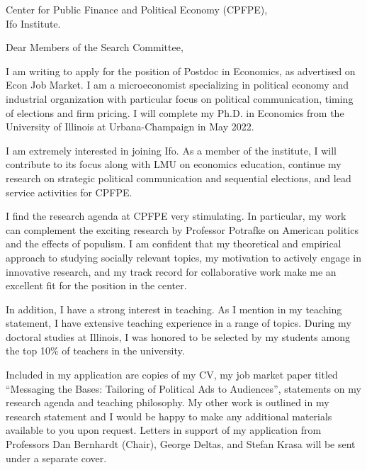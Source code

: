 \documentclass[12pt]{letter}
\begin{document}
\date{}
\begin{letter}{Center for Public Finance and Political Economy (CPFPE),\\
Ifo Institute.}

\opening{Dear Members of the Search Committee,}

I am writing to apply for the position of Postdoc in Economics, as advertised on Econ Job Market.
I am a microeconomist specializing in political economy and industrial organization with particular focus on political communication, timing of elections and firm pricing.
I will complete my Ph.D. in Economics from the University of Illinois at Urbana-Champaign in May 2022. 

I am extremely interested in joining Ifo.
As a member of the institute, I will contribute to its focus along with LMU on economics education,
continue my research on strategic political communication and sequential elections, and lead service activities for CPFPE.

I find the research agenda at CPFPE very stimulating.
In particular, my work can complement the exciting research by Professor Potrafke on American politics and the effects of populism.
I am confident that my theoretical and empirical approach to studying socially relevant topics, 
my motivation to actively engage in innovative research, and my track record for collaborative work
make me an excellent fit for the position in the center.


In addition, I have a strong interest in teaching.
As I mention in my teaching statement, I have extensive teaching experience in a range of topics.
During my doctoral studies at Illinois, I was honored to be selected by my students among the top 10\% of teachers in the university.

Included in my application are copies of my CV, my job market paper titled ``Messaging the Bases: Tailoring of Political Ads to Audiences'',
statements on my research agenda and teaching philosophy.
My other work is outlined in my research statement and I would be happy to make any additional materials available to you upon request.
Letters in support of my application from Professors Dan Bernhardt (Chair), George Deltas, and Stefan Krasa will be sent under a separate cover. 


\end{letter}
\end{document}
